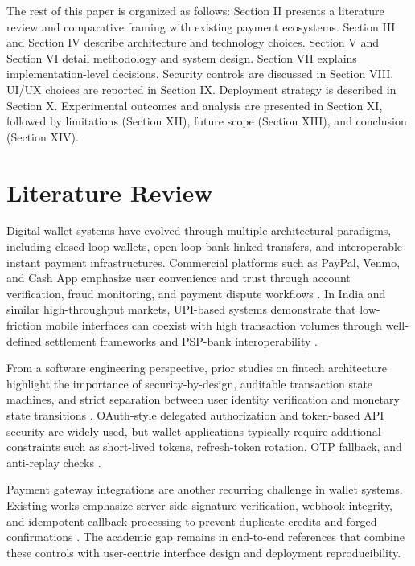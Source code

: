 \documentclass[conference]{IEEEtran}
\begin{document}
The rest of this paper is organized as follows: Section II presents a literature review and comparative framing with existing payment ecosystems. Section III and Section IV describe architecture and technology choices. Section V and Section VI detail methodology and system design. Section VII explains implementation-level decisions. Security controls are discussed in Section VIII. UI/UX choices are reported in Section IX. Deployment strategy is described in Section X. Experimental outcomes and analysis are presented in Section XI, followed by limitations (Section XII), future scope (Section XIII), and conclusion (Section XIV).

\section{Literature Review}
Digital wallet systems have evolved through multiple architectural paradigms, including closed-loop wallets, open-loop bank-linked transfers, and interoperable instant payment infrastructures. Commercial platforms such as PayPal, Venmo, and Cash App emphasize user convenience and trust through account verification, fraud monitoring, and payment dispute workflows \cite{paypal,venmo,cashapp}. In India and similar high-throughput markets, UPI-based systems demonstrate that low-friction mobile interfaces can coexist with high transaction volumes through well-defined settlement frameworks and PSP-bank interoperability \cite{upi,upi_scale,npci}.

From a software engineering perspective, prior studies on fintech architecture highlight the importance of security-by-design, auditable transaction state machines, and strict separation between user identity verification and monetary state transitions \cite{owasp_api,fintech_security,psd2}. OAuth-style delegated authorization and token-based API security are widely used, but wallet applications typically require additional constraints such as short-lived tokens, refresh-token rotation, OTP fallback, and anti-replay checks \cite{jwt_rfc,oauth2,zero_trust}.

Payment gateway integrations are another recurring challenge in wallet systems. Existing works emphasize server-side signature verification, webhook integrity, and idempotent callback processing to prevent duplicate credits and forged confirmations \cite{stripe_idempotency,webhook_security,razorpay_docs}. The academic gap remains in end-to-end references that combine these controls with user-centric interface design and deployment reproducibility.
\end{document}
